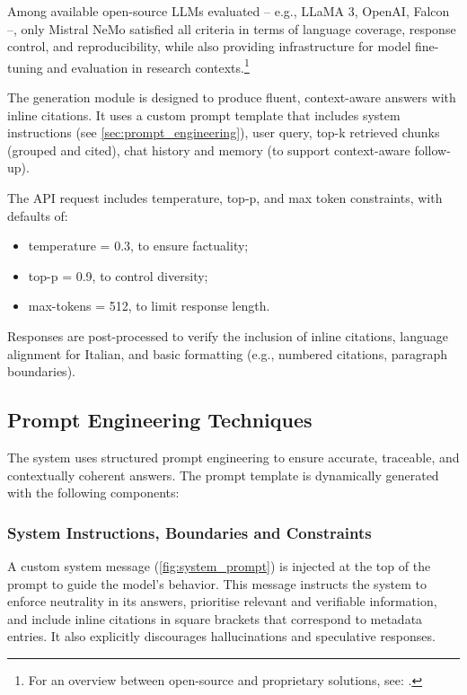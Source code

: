 \begin{spacing}{1.5}
Among available open-source LLMs evaluated -- e.g., LLaMA 3, OpenAI, Falcon --, only Mistral NeMo satisfied all criteria in terms of language coverage, response control, and reproducibility, while also providing infrastructure for model fine-tuning and evaluation in research contexts.\footnote{For an overview between open-source and proprietary solutions, see: \textcite{noauthor_open_2025}.}

The generation module is designed to produce fluent, context-aware answers with inline citations. It uses a custom prompt template that includes system instructions (see \autoref{sec:prompt_engineering}), user query, top-k retrieved chunks (grouped and cited), chat history and memory (to support context-aware follow-up).

The API request includes temperature, top-p, and max token constraints, with defaults of:
\begin{itemize}
      \item temperature = 0.3, to ensure factuality;
      \item top-p = 0.9, to control diversity;
      \item max-tokens = 512, to limit response length.
\end{itemize}

Responses are post-processed to verify the inclusion of inline citations, language alignment for Italian, and basic formatting (e.g., numbered citations, paragraph boundaries).

\subsection{Prompt Engineering Techniques} \label{sec:prompt_engineering}
The system uses structured prompt engineering to ensure accurate, traceable, and contextually coherent answers. The prompt template is dynamically generated with the following components:

\subsubsection*{System Instructions, Boundaries and Constraints}
A custom system message (\autoref{fig:system_prompt}) is injected at the top of the prompt to guide the model’s behavior. This message instructs the system to enforce neutrality in its answers, prioritise relevant and verifiable information, and include inline citations in square brackets that correspond to metadata entries. It also explicitly discourages hallucinations and speculative responses.


\end{spacing}
